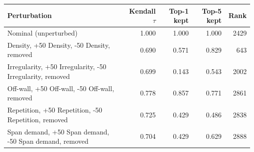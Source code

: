\setlength{\tabcolsep}{5pt}
\begin{tabular}{@{}lrrrr@{}}
\toprule
Perturbation & Kendall $\tau$ & Top-1 kept & Top-5 kept & Rank \\
\midrule
Nominal (unperturbed) & 1.000 & 1.000 & 1.000 & 2429 \\
Density, +50%
Density, -50%
Density, removed & 0.690 & 0.571 & 0.829 & 643 \\
Irregularity, +50%
Irregularity, -50%
Irregularity, removed & 0.699 & 0.143 & 0.543 & 2002 \\
Off-wall, +50%
Off-wall, -50%
Off-wall, removed & 0.778 & 0.857 & 0.771 & 2861 \\
Repetition, +50%
Repetition, -50%
Repetition, removed & 0.725 & 0.429 & 0.486 & 2838 \\
Span demand, +50%
Span demand, -50%
Span demand, removed & 0.704 & 0.429 & 0.629 & 2888 \\
\bottomrule
\end{tabular}